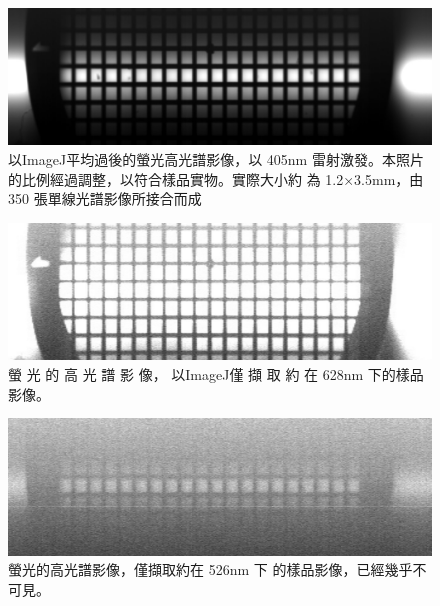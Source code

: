 \documentclass[12pt]{article}
\begin{document}
\begin{figure}
    \centering
    \includegraphics[width = 0.9\linewidth]{AVG_1211_10um_15msLaser.tiff-2.jpg}
    \caption[以ImageJ平均過後的螢光高光譜影像]{以ImageJ平均過後的螢光高光譜影像，以 405nm 雷射激發。本照片的比例經過調整，以符合樣品實物。實際大小約
    為 1.2×3.5mm，由 350 張單線光譜影像所接合而成}
    \label{fig: flourenceAvg}
\end{figure}

\begin{figure}
    \centering
    \includegraphics[width = 0.9\linewidth]{1211_10um_15msLaser-1.jpg}
    \caption[螢光的高光譜影像]{螢 光 的 高 光 譜 影 像， 以ImageJ僅 擷 取 約 在
    628nm 下的樣品影像。}
    \label{fig: flourence628}
\end{figure}

\begin{figure}
    \centering
    \includegraphics[width = 0.9\linewidth]{1211_10um_15msLaser.tiff137-1.jpg}
    \caption[螢 光 的 高 光 譜 影 像(526nm)]{螢光的高光譜影像，僅擷取約在 526nm 下
    的樣品影像，已經幾乎不可見。}
    \label{fig: flourence526}
\end{figure}
\end{document}

